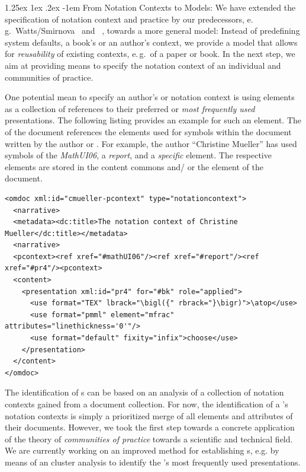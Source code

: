 \documentclass[pdftex,bibtotocnumbered,idxtotoc,11pt]{scrartcl}
\makeatletter
\renewcommand\paragraph{\@startsection{paragraph}{4}{\z@}%
{1.25ex \@plus1ex \@minus.2ex}%
{-1em}%
{\setlength{\parfillskip}{\z@ \@plus 1fil}%
\raggedsection\normalfont\sectfont\nobreak
\size@paragraph\nobreak}}
\makeatother
\begin{document}
\paragraph{From Notation Contexts to {\cop} Models:} 
We have extended the specification of notation context and practice by our predecessors,
e.\,g.\ Watts/Smirnova~\cite{ESmStW:Notation} and {\activemath}~\cite{ManLib:apo05},
towards a more general model: Instead of predefining system defaults, a book's or an
author's context, we provide a model that allows for {\emph{reusability}} of existing
contexts, e.\,g.\ of a paper or book. In the next step, we aim at providing means to
specify the notation context of an individual and communities of practice.

One potential mean to specify an author's or {\cop} notation context is using
{} elements as a collection of references to their preferred or {\emph{most
    frequently used}} presentations. The following listing provides an example for such an
{} element. The {} of the document references the
{} elements used for symbols within the document written by the
author or {\cop}. For example, the author ``Christine Mueller'' has used symbols of the
\emph{MathUI06}, a \emph{report}, and a \emph{specific} {}
element. The respective {} elements are stored in the content
commons and/ or the {} element of the document.

\begin{lstlisting}
<omdoc xml:id="cmueller-pcontext" type="notationcontext">
  <narrative>
  <metadata><dc:title>The notation context of Christine Mueller</dc:title></metadata>
  <narrative>
  <pcontext><ref xref="#mathUI06"/><ref xref="#report"/><ref xref="#pr4"/><pcontext>
  <content>
    <presentation xml:id="pr4" for="#bk" role="applied">
      <use format="TEX" lbrack="\bigl({" rbrack="}\bigr)">\atop</use>
      <use format="pmml" element="mfrac" attributes="linethickness='0'"/>
      <use format="default" fixity="infix">choose</use>
    </presentation>
  </content>
</omdoc>
\end{lstlisting}

The identification of {\cop}s can be based on an analysis of a collection of notation
contexts gained from a document collection. For now, the identification of a {\cop}'s
notation contexts is simply a prioritized merge of all {} elements and
{} attributes of their documents. However, we took the first step towards
a concrete application of the theory of {\emph{communities of practice}} towards a
scientific and technical field. We are currently working on an improved method for
establishing {\cop}s, e.g. by means of an cluster analysis to identify the {\cop}'s most
frequently used presentations.
\end{document}
